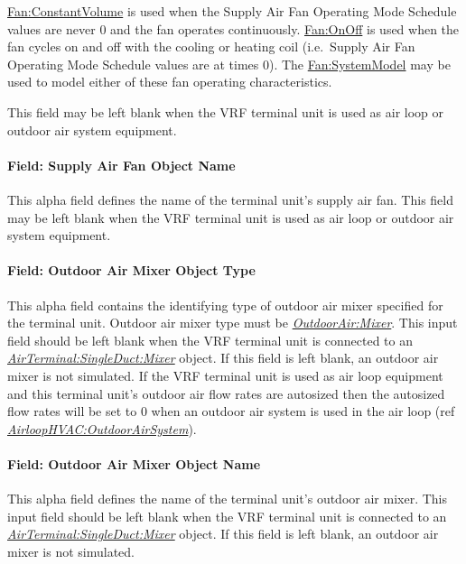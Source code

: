 \hyperref[fanconstantvolume]{Fan:ConstantVolume} is used when the Supply Air Fan Operating Mode Schedule values are never 0 and the fan operates continuously. \hyperref[fanonoff]{Fan:OnOff} is used when the fan cycles on and off with the cooling or heating coil (i.e.~Supply Air Fan Operating Mode Schedule values are at times 0). The \hyperref[fansystemmodel]{Fan:SystemModel} may be used to model either of these fan operating characteristics.

This field may be left blank when the VRF terminal unit is used as air loop or outdoor air system equipment.

\paragraph{Field: Supply Air Fan Object Name}\label{field-supply-air-fan-object-name}

This alpha field defines the name of the terminal unit's supply air fan. This field may be left blank when the VRF terminal unit is used as air loop or outdoor air system equipment.

\paragraph{Field: Outdoor Air Mixer Object Type}

This alpha field contains the identifying type of outdoor air mixer specified for the terminal unit. Outdoor air mixer type must be \textit{\hyperref[outdoorairmixer]{OutdoorAir:Mixer}}. This input field should be left blank when the VRF terminal unit is connected to an \textit{\hyperref[airterminalsingleductmixer]{AirTerminal:SingleDuct:Mixer}} object. If this field is left blank, an outdoor air mixer is not simulated. If the VRF terminal unit is used as air loop equipment and this terminal unit's outdoor air flow rates are autosized then the autosized flow rates will be set to 0 when an outdoor air system is used in the air loop (ref \textit{\hyperref[airloophvacoutdoorairsystem]{AirloopHVAC:OutdoorAirSystem}}).

\paragraph{Field: Outdoor Air Mixer Object Name}\label{field-outdoor-air-mixer-object-name}

This alpha field defines the name of the terminal unit's outdoor air mixer. This input field should be left blank when the VRF terminal unit is connected to an \textit{\hyperref[airterminalsingleductmixer]{AirTerminal:SingleDuct:Mixer}} object. If this field is left blank, an outdoor air mixer is not simulated.

